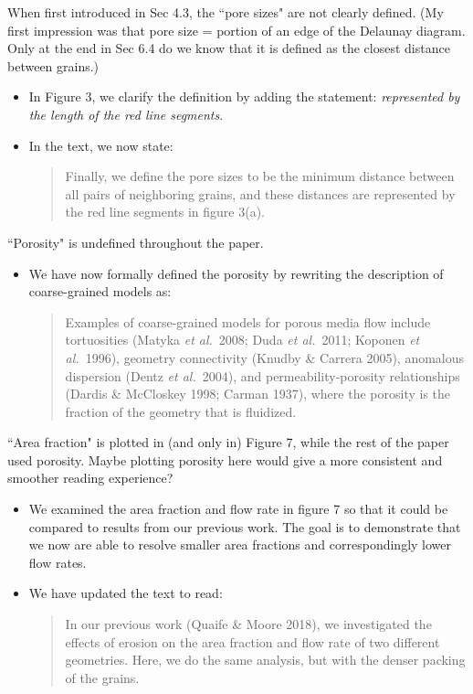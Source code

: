 \documentclass[11pt]{article}
\newcommand{\comment}[1]{{\color{blue} #1}}
\begin{document}
\noindent
\comment{When first introduced in Sec 4.3, the ``pore sizes" are not
clearly defined. (My first impression was that pore size = portion of an
edge of the Delaunay diagram. Only at the end in Sec 6.4 do we know that
it is defined as the closest distance between grains.)}
\begin{itemize}
  \item In Figure 3, we clarify the definition by adding the statement:
    {\em represented by the length of the red line segments}.
  \item In the text, we now state:
    \begin{quotation}
    \noindent
      Finally, we define the pore sizes to be the minimum distance
      between all pairs of neighboring grains, and these distances are
      represented by the red line segments in figure 3(a).
    \end{quotation}
\end{itemize}

\noindent
\comment{``Porosity" is undefined throughout the paper.}
\begin{itemize}
  \item We have now formally defined the porosity by rewriting the
    description of coarse-grained models as:
  \begin{quotation}
  \noindent
    Examples of coarse-grained models for porous media flow include
    tortuosities (Matyka {\em et al.}~2008; Duda {\em et al.}~2011;
    Koponen {\em et al.}~1996), geometry connectivity (Knudby \& Carrera
    2005), anomalous dispersion (Dentz {\em et al.}~2004), and
    permeability-porosity relationships (Dardis \& McCloskey 1998;
    Carman 1937), where the porosity is the fraction of the geometry
    that is fluidized.
  \end{quotation}


\end{itemize}

\noindent
\comment{``Area fraction" is plotted in (and only in) Figure 7, while
the rest of the paper used porosity. Maybe plotting porosity here would
give a more consistent and smoother reading experience?}
\begin{itemize}
  \item We examined the area fraction and flow rate in figure 7 so that
    it could be compared to results from our previous work. The goal is
    to demonstrate that we now are able to resolve smaller area
    fractions and correspondingly lower flow rates.

  \item We have updated the text to read:
    \begin{quotation}
      \noindent
      In our previous work (Quaife \& Moore 2018), we investigated the
      effects of erosion on the area fraction and flow rate of two
      different geometries. Here, we do the same analysis, but with the
      denser packing of the grains.
    \end{quotation}

\end{itemize}
\end{document}
